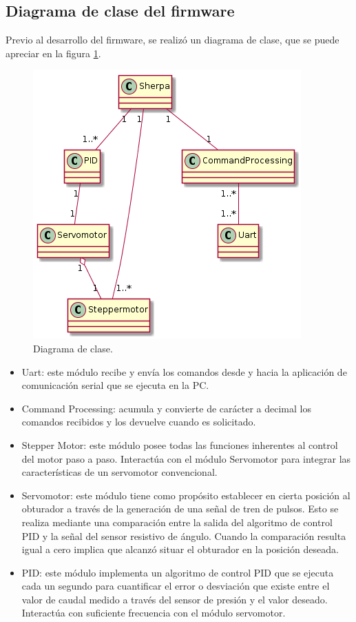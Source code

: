 \subsection{Diagrama de clase del firmware}
\label{subsec:Diagrama de clase}
Previo al desarrollo del firmware, se realizó un diagrama de clase, que se puede apreciar en la figura \ref{fig:Diagrama de clase.}. 
\begin{figure}[h]
	\centering
	\includegraphics[scale=.65]{./Figures/DiagramaDeClase-DistribucionDeAgua.png}
	\caption{Diagrama de clase.}
	\label{fig:Diagrama de clase.}
	\end{figure}
\begin{itemize}

\item Uart: este módulo recibe y envía los comandos desde y hacia la aplicación de comunicación serial que se ejecuta en la PC.

\item Command Processing: acumula y convierte de carácter a decimal los comandos recibidos y los devuelve cuando es solicitado.

\item Stepper Motor: este módulo posee todas las funciones inherentes al control del motor paso a paso. Interactúa con el módulo Servomotor para integrar las características de un servomotor convencional. 

\item Servomotor: este módulo tiene como propósito establecer en cierta posición al obturador a través de la generación de una señal de tren de pulsos. Esto se realiza mediante una comparación entre la salida del algoritmo de control PID y la señal del sensor resistivo de ángulo. Cuando la comparación resulta igual a cero implica que alcanzó situar el obturador en la posición deseada. 

\item PID: este módulo implementa un algoritmo de control PID que se ejecuta cada un segundo para cuantificar el error o desviación que existe entre el valor de caudal medido a través del sensor de presión y el valor deseado. Interactúa con suficiente frecuencia con el módulo servomotor.
\end{itemize}


